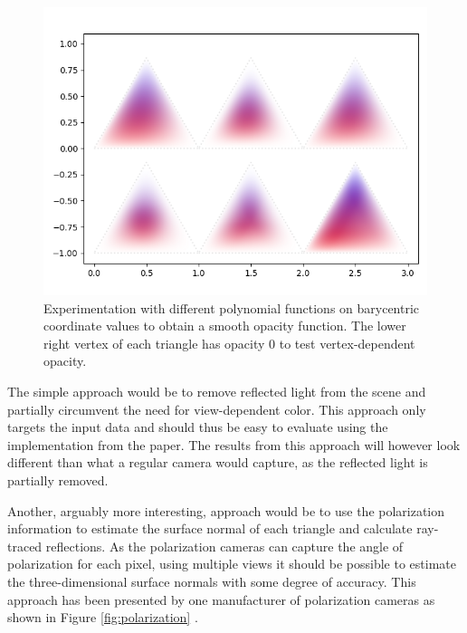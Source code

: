 \begin{figure}
    \centering
    \includegraphics[width=\linewidth]{images/alphas.png}
    \caption{Experimentation with different polynomial functions on barycentric coordinate values to obtain a smooth opacity function. The lower right vertex of each triangle has opacity 0 to test vertex-dependent opacity.}
    \label{fig:alphas}
\end{figure}



The simple approach would be to remove reflected light from the scene and partially circumvent the need for view-dependent color.
This approach only targets the input data and should thus be easy to evaluate using the implementation from the paper.
The results from this approach will however look different than what a regular camera would capture, as the reflected light is partially removed.

Another, arguably more interesting, approach would be to use the polarization information to estimate the surface normal of each triangle and calculate ray-traced reflections.
As the polarization cameras can capture the angle of polarization for each pixel, using multiple views it should be possible to estimate the three-dimensional surface normals with some degree of accuracy.
This approach has been presented by one manufacturer of polarization cameras as shown in Figure \ref{fig:polarization} \cite{lucidvisionlabs3DDepthSurface2021}.





